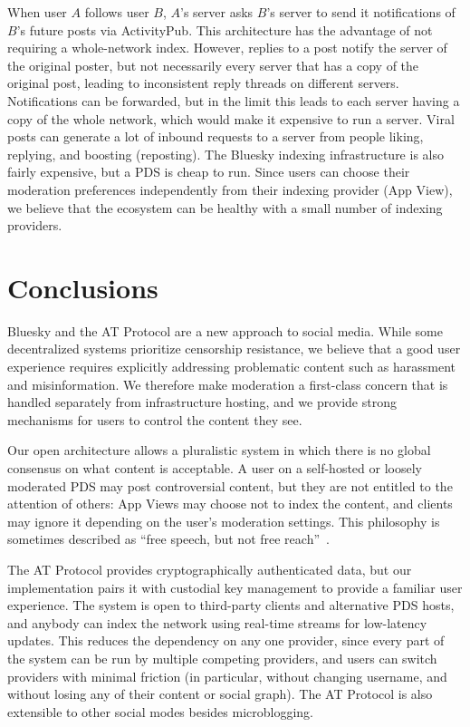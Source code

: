 \documentclass[sigconf,nonacm]{acmart}
\begin{document}
When user $A$ follows user $B$, $A$'s server asks $B$'s server to send it notifications of $B$'s future posts via ActivityPub.
This architecture has the advantage of not requiring a whole-network index.
However, replies to a post notify the server of the original poster, but not necessarily every server that has a copy of the original post, leading to inconsistent reply threads on different servers.
Notifications can be forwarded, but in the limit this leads to each server having a copy of the whole network, which would make it expensive to run a server.
Viral posts can generate a lot of inbound requests to a server from people liking, replying, and boosting (reposting).
The Bluesky indexing infrastructure is also fairly expensive, but a PDS is cheap to run.
Since users can choose their moderation preferences independently from their indexing provider (App View), we believe that the ecosystem can be healthy with a small number of indexing providers.



\section{Conclusions}

Bluesky and the AT Protocol are a new approach to social media.
While some decentralized systems prioritize censorship resistance, we believe that a good user experience requires explicitly addressing problematic content such as harassment and misinformation.
We therefore make moderation a first-class concern that is handled separately from infrastructure hosting, and we provide strong mechanisms for users to control the content they see.

Our open architecture allows a pluralistic system in which there is no global consensus on what content is acceptable.
A user on a self-hosted or loosely moderated PDS may post controversial content, but they are not entitled to the attention of others: App Views may choose not to index the content, and clients may ignore it depending on the user's moderation settings.
This philosophy is sometimes described as ``free speech, but not free reach''~\cite{DiResta:2018}.

The AT Protocol provides cryptographically authenticated data, but our implementation pairs it with custodial key management to provide a familiar user experience.
The system is open to third-party clients and alternative PDS hosts, and anybody can index the network using real-time streams for low-latency updates.
This reduces the dependency on any one provider, since every part of the system can be run by multiple competing providers, and users can switch providers with minimal friction (in particular, without changing username, and without losing any of their content or social graph).
The AT Protocol is also extensible to other social modes besides microblogging.
\end{document}
